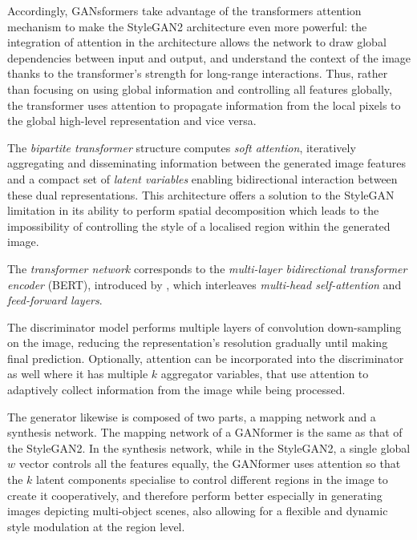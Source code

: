 \documentclass{article}
\begin{document}
Accordingly, GANsformers take advantage of the transformers attention mechanism to make the 
StyleGAN2 architecture even more powerful: the integration of attention in the architecture allows 
the network to draw global dependencies between input and output, and understand the context of 
the image thanks to the transformer's strength for long-range interactions.
Thus, rather than focusing on using global information and controlling all features globally, 
the transformer uses attention to propagate information from the local pixels to the global high-level 
representation and vice versa. 

The \textit{bipartite transformer} structure computes \textit{soft attention}, iteratively aggregating 
and disseminating information between the generated image features and a compact set of 
\textit{latent variables} enabling bidirectional interaction between these dual representations. 
This architecture offers a solution to the StyleGAN limitation in its ability to perform spatial 
decomposition which leads to the impossibility of controlling the style of a localised region 
within the generated image.

The \textit{transformer network} corresponds to the \textit{multi-layer bidirectional transformer 
	encoder} (BERT), introduced by \citet{devlin2019bert}, which interleaves \textit{multi-head 
	self-attention} and \textit{feed-forward layers}. 

The discriminator model performs multiple layers of convolution down-sampling on the image, 
reducing the representation's resolution gradually until making final prediction. 
Optionally, attention can be incorporated into the discriminator as well where it has multiple $k$ 
aggregator variables, that use attention to adaptively collect information from the image while being 
processed. 

The generator likewise is composed of two parts, a mapping network and a synthesis 
network. 
The mapping network of a GANformer is the same as that of the StyleGAN2.
In the synthesis network, while in the StyleGAN2, a single global $w$ vector controls all the 
features equally, the GANformer uses attention so that the $k$ latent components specialise to 
control different regions in the image to create it cooperatively, and therefore perform better 
especially in generating images depicting multi-object scenes, also allowing for a flexible and 
dynamic style modulation at the region level.
\end{document}
